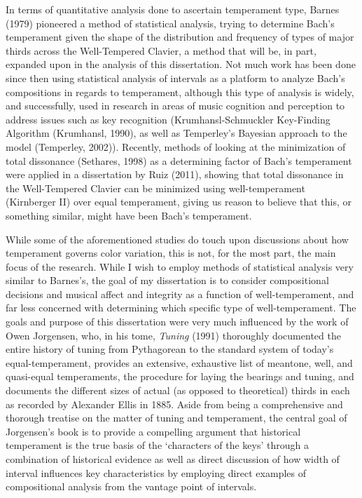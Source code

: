 In terms of quantitative analysis done to ascertain temperament type,
Barnes (1979) pioneered a method of statistical analysis, trying to
determine Bach's temperament given the shape of the distribution and
frequency of types of major thirds across the Well-Tempered Clavier, a
method that will be, in part, expanded upon in the analysis of this
dissertation. Not much work has been done since then using statistical
analysis of intervals as a platform to analyze Bach's compositions in
regards to temperament, although this type of analysis is widely, and
successfully, used in research in areas of music cognition and
perception to address issues such as key recognition
(Krumhansl-Schmuckler Key-Finding Algorithm (Krumhansl, 1990), as well
as Temperley's Bayesian approach to the model (Temperley, 2002)).
Recently, methods of looking at the minimization of total dissonance
(Sethares, 1998) as a determining factor of Bach's temperament were
applied in a dissertation by Ruiz (2011), showing that total dissonance
in the Well-Tempered Clavier can be minimized using well-temperament
(Kirnberger II) over equal temperament, giving us reason to believe that
this, or something similar, might have been Bach's temperament.

While some of the aforementioned studies do touch upon discussions about
how temperament governs color variation, this is not, for the most part,
the main focus of the research. While I wish to employ methods of
statistical analysis very similar to Barnes's, the goal of my
dissertation is to consider compositional decisions and musical affect
and integrity as a function of well-temperament, and far less concerned
with determining which specific type of well-temperament. The goals and
purpose of this dissertation were very much influenced by the work of
Owen Jorgensen, who, in his tome, \emph{Tuning} (1991) thoroughly
documented the entire history of tuning from Pythagorean to the standard
system of today's equal-temperament, provides an extensive, exhaustive
list of meantone, well, and quasi-equal temperaments, the procedure for
laying the bearings and tuning, and documents the different sizes of
actual (as opposed to theoretical) thirds in each as recorded by
Alexander Ellis in 1885. Aside from being a comprehensive and thorough
treatise on the matter of tuning and temperament, the central goal of
Jorgensen's book is to provide a compelling argument that historical
temperament is the true basis of the `characters of the keys' through a
combination of historical evidence as well as direct discussion of how
width of interval influences key characteristics by employing direct
examples of compositional analysis from the vantage point of intervals.

